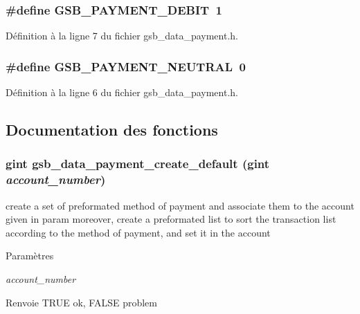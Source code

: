 \subsubsection[{GSB\_\-PAYMENT\_\-DEBIT}]{\setlength{\rightskip}{0pt plus 5cm}\#define GSB\_\-PAYMENT\_\-DEBIT~1}\label{gsb__data__payment_8h_a75b824ed98739971febf033ea0293012}


Définition à la ligne 7 du fichier gsb\_\-data\_\-payment.h.

\subsubsection[{GSB\_\-PAYMENT\_\-NEUTRAL}]{\setlength{\rightskip}{0pt plus 5cm}\#define GSB\_\-PAYMENT\_\-NEUTRAL~0}\label{gsb__data__payment_8h_a4cc6ee85419c370a33a7f4522cb96b31}


Définition à la ligne 6 du fichier gsb\_\-data\_\-payment.h.



\subsection{Documentation des fonctions}
\subsubsection[{gsb\_\-data\_\-payment\_\-create\_\-default}]{\setlength{\rightskip}{0pt plus 5cm}gint gsb\_\-data\_\-payment\_\-create\_\-default (gint {\em account\_\-number})}\label{gsb__data__payment_8h_ac5615b1d09ddb9d46e13d9cf552e1925}
create a set of preformated method of payment and associate them to the account given in param moreover, create a preformated list to sort the transaction list according to the method of payment, and set it in the account


\begin{DoxyParams}{Paramètres}
\item[{\em account\_\-number}]\end{DoxyParams}
\begin{DoxyReturn}{Renvoie}
TRUE ok, FALSE problem 
\end{DoxyReturn}



